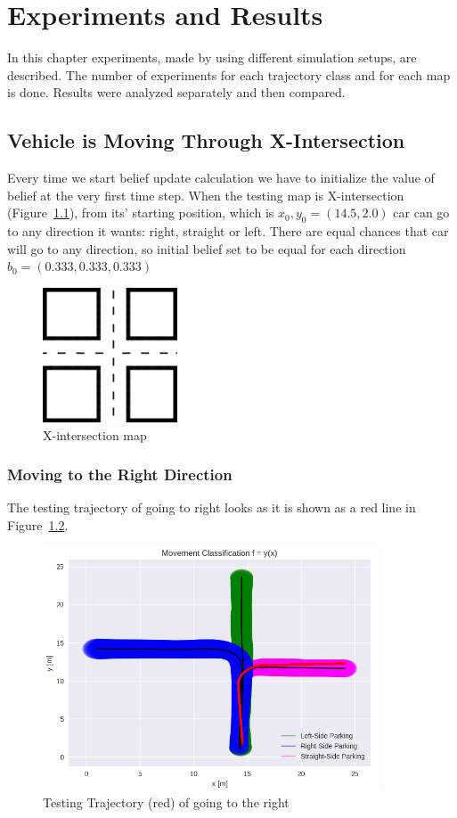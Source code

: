 \chapter{Experiments and Results}
\label{chap:4}
%
In this chapter experiments, made by using different simulation setups, are described. The number of experiments for each trajectory class and for each map is done. Results were analyzed separately and then compared.

\section{Vehicle is Moving Through X-Intersection}

Every time we start belief update calculation we have to initialize the value of belief at the very first time step. When the testing map is X-intersection (Figure~\ref{fig:Xint}), from its' starting position, which is $x_0,y_0 = (14.5, 2.0)$ car can go to any direction it wants: right, straight or left. There are equal chances that car will go to any direction, so initial belief set to be equal for each direction $b_0 = (0.333, 0.333, 0.333)$

\begin{figure}[H]
	\centering  	
	\includegraphics[width=4cm]{img/X-int.jpg}
	\caption{X-intersection map}
	\label{fig:Xint}    
\end{figure}

\subsection{Moving to the Right Direction}

The testing trajectory of going to right looks as it is shown as a red line in Figure~\ref{fig:right}.

\begin{figure}[H]
	\centering  	
	\includegraphics[width=10cm]{img/right_org.jpg}
	\caption{Testing Trajectory (red) of going to the right}
	\label{fig:right}    
\end{figure}


